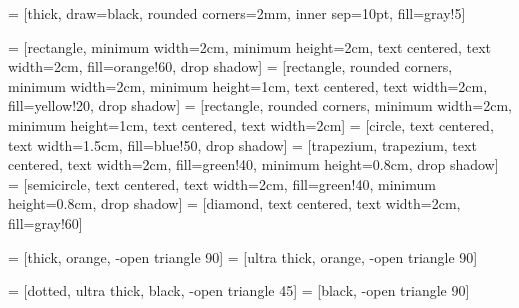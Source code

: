 \usepackage{tikz}
\usetikzlibrary{calc}
\usetikzlibrary{fit}
\usetikzlibrary{shapes}
\usetikzlibrary{positioning}
\usetikzlibrary{matrix, backgrounds, arrows, shadows}


 = [thick, draw=black, rounded corners=2mm, inner sep=10pt, fill=gray!5]

 = [rectangle, minimum width=2cm, minimum height=2cm, text centered, text width=2cm, fill=orange!60, drop shadow]
 = [rectangle, rounded corners, minimum width=2cm, minimum height=1cm, text centered, text width=2cm, fill=yellow!20, drop shadow]
 = [rectangle, rounded corners, minimum width=2cm, minimum height=1cm, text centered, text width=2cm]
 = [circle, text centered, text width=1.5cm, fill=blue!50, drop shadow]
 = [trapezium, trapezium, text centered, text width=2cm, fill=green!40, minimum height=0.8cm, drop shadow]
 = [semicircle, text centered, text width=2cm, fill=green!40, minimum height=0.8cm, drop shadow]
 = [diamond, text centered, text width=2cm, fill=gray!60]

 = [thick, orange, -open triangle 90]
 = [ultra thick, orange, -open triangle 90]

 = [dotted, ultra thick, black, -open triangle 45]
 = [black, -open triangle 90]